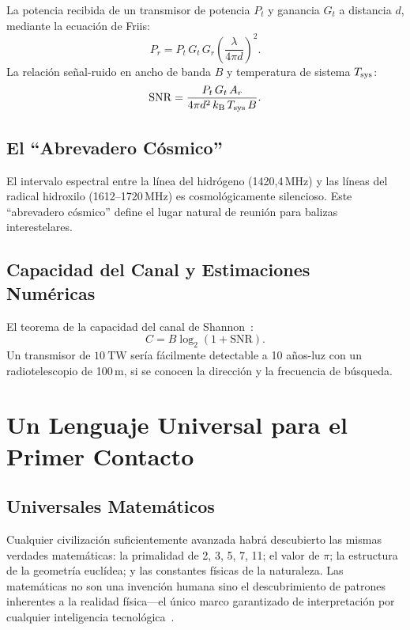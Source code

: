 \documentclass[12pt,a4paper]{article}
\newcommand{\kB}{k_{\mathrm{B}}}
\begin{document}
La potencia recibida de un transmisor de potencia $P_t$ y ganancia $G_t$ a
distancia $d$, mediante la ecuación de Friis:
\begin{equation}
  P_r = P_t\,G_t\,G_r\!\left(\frac{\lambda}{4\pi d}\right)^2.
\end{equation}
La relación señal-ruido en ancho de banda $B$ y temperatura de sistema
$T_{\rm sys}$:
\begin{equation}
  \mathrm{SNR} = \frac{P_t\,G_t\,A_r}{4\pi d^2\,\kB\,T_{\rm sys}\,B}.
\end{equation}

\subsection{El ``Abrevadero Cósmico''}

El intervalo espectral entre la línea del hidrógeno (1420{,}4\,MHz) y las
líneas del radical hidroxilo (1612--1720\,MHz) es cosmológicamente silencioso.
Este ``abrevadero cósmico'' define el lugar natural de reunión para balizas
interestelares.

\subsection{Capacidad del Canal y Estimaciones Numéricas}

El teorema de la capacidad del canal de Shannon~\citep{Shannon1948}:
\begin{equation}
  C = B\log_2\!\left(1 + \mathrm{SNR}\right).
\end{equation}
Un transmisor de $\SI{10}{\tera\watt}$ sería fácilmente detectable a 10
años-luz con un radiotelescopio de 100\,m, si se conocen la dirección y la
frecuencia de búsqueda.

\section{Un Lenguaje Universal para el Primer Contacto}

\subsection{Universales Matemáticos}

Cualquier civilización suficientemente avanzada habrá descubierto las mismas
verdades matemáticas: la primalidad de 2, 3, 5, 7, 11; el valor de $\pi$;
la estructura de la geometría euclídea; y las constantes físicas de la
naturaleza. Las matemáticas no son una invención humana sino el descubrimiento
de patrones inherentes a la realidad física---el único marco garantizado de
interpretación por cualquier inteligencia tecnológica~\citep{Penrose1989}.
\end{document}
